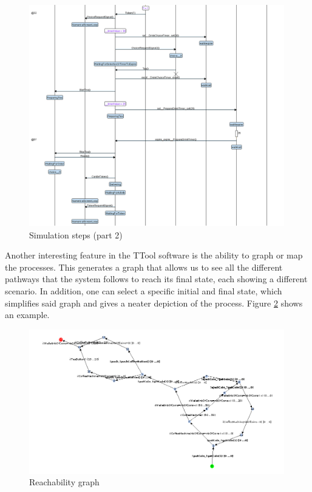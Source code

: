 \documentclass[12pt]{article}
\begin{document}
\begin{figure}[htbp]
\centering
\includegraphics[width=0.99\textwidth]{fig/simstep2.png}
\caption{Simulation steps (part 2)} \label{fig:simstep2}
\end{figure}


	Another interesting feature in the TTool software is the ability to graph or map the processes. This generates a graph that allows us to see all the different pathways that the system follows to reach its final state, each showing a different scenario. In addition, one can select a specific initial and final state, which simplifies said graph and gives a neater depiction of the process. Figure \ref{fig:rg} shows an example. 

\begin{figure}[htbp]
\centering
\includegraphics[width=0.99\textwidth]{fig/rg.png}
\caption{Reachability graph} \label{fig:rg}
\end{figure}
\end{document}
